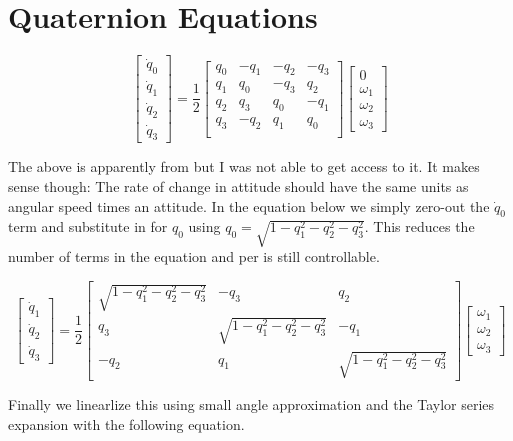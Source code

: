\documentclass{article}
\begin{document}
\section*{\small Quaternion Equations}
\[
\begin{bmatrix}
\dot{q}_0 \\
\dot{q}_1 \\
\dot{q}_2 \\
\dot{q}_3
\end{bmatrix}
=
\frac{1}{2}
\begin{bmatrix}
q_0 & -q_1 & -q_2 & -q_3 \\
q_1 & q_0 & -q_3 & q_2 \\
q_2 & q_3 & q_0 & -q_1 \\
q_3 & -q_2 & q_1 & q_0 \\
\end{bmatrix}
\begin{bmatrix}
0 \\
\omega_1 \\
\omega_2 \\
\omega_3
\end{bmatrix}
\]

\noindent The above is apparently from \cite{noaccess} but I was not able to
get access to it. It makes sense though: The rate of change in
attitude should have the same units as angular speed times an
attitude. In the equation below we simply zero-out the $\dot{q}_0$
term and substitute in for $q_0$ using $q_0 = \sqrt{1 - q_1^2 
- q_2^2 - q_3^2}$. This reduces the number of terms in the equation
and per \cite{quatsforspacecraft} is still controllable.

\[
\begin{bmatrix}
\dot{q}_1 \\
\dot{q}_2 \\
\dot{q}_3
\end{bmatrix}
=
\frac{1}{2}
\begin{bmatrix}
\sqrt{1 - q_1^2 - q_2^2 - q_3^2} & -q_3 & q_2 \\
q_3 & \sqrt{1 - q_1^2 - q_2^2 - q_3^2} & -q_1 \\
-q_2 & q_1 & \sqrt{1 - q_1^2 - q_2^2 - q_3^2}
\end{bmatrix}
\begin{bmatrix}
\omega_1 \\
\omega_2 \\
\omega_3
\end{bmatrix}
\]

\noindent Finally we linearlize this using small angle approximation and the 
Taylor series expansion with the following equation. 
\end{document}

